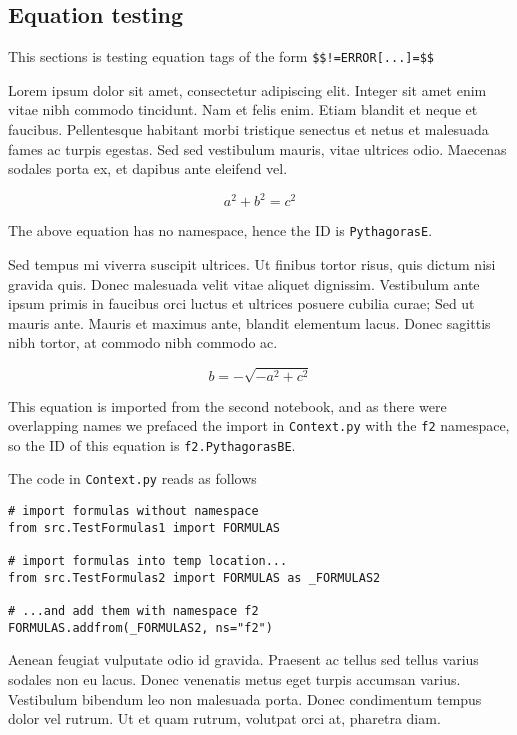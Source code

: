 \documentclass[11pt]{article}
\begin{document}
\hypertarget{equation-testing}{%
\subsection{Equation testing}\label{equation-testing}}

This sections is testing equation tags of the form
\texttt{\$\$!=ERROR{[}...{]}=\$\$}

Lorem ipsum dolor sit amet, consectetur adipiscing elit. Integer sit
amet enim vitae nibh commodo tincidunt. Nam et felis enim. Etiam blandit
et neque et faucibus. Pellentesque habitant morbi tristique senectus et
netus et malesuada fames ac turpis egestas. Sed sed vestibulum mauris,
vitae ultrices odio. Maecenas sodales porta ex, et dapibus ante eleifend
vel.

\[
a^{2} + b^{2} = c^{2}
\]

The above equation has no namespace, hence the ID is
\texttt{PythagorasE}.

Sed tempus mi viverra suscipit ultrices. Ut finibus tortor risus, quis
dictum nisi gravida quis. Donec malesuada velit vitae aliquet dignissim.
Vestibulum ante ipsum primis in faucibus orci luctus et ultrices posuere
cubilia curae; Sed ut mauris ante. Mauris et maximus ante, blandit
elementum lacus. Donec sagittis nibh tortor, at commodo nibh commodo ac.

\[
b = - \sqrt{- a^{2} + c^{2}}
\]

This equation is imported from the second notebook, and as there were
overlapping names we prefaced the import in \texttt{Context.py} with the
\texttt{f2} namespace, so the ID of this equation is
\texttt{f2.PythagorasBE}.

The code in \texttt{Context.py} reads as follows

\begin{verbatim}
# import formulas without namespace
from src.TestFormulas1 import FORMULAS    

# import formulas into temp location...                  
from src.TestFormulas2 import FORMULAS as _FORMULAS2 

# ...and add them with namespace f2       
FORMULAS.addfrom(_FORMULAS2, ns="f2")                       
\end{verbatim}

Aenean feugiat vulputate odio id gravida. Praesent ac tellus sed tellus
varius sodales non eu lacus. Donec venenatis metus eget turpis accumsan
varius. Vestibulum bibendum leo non malesuada porta. Donec condimentum
tempus dolor vel rutrum. Ut et quam rutrum, volutpat orci at, pharetra
diam.
\end{document}
